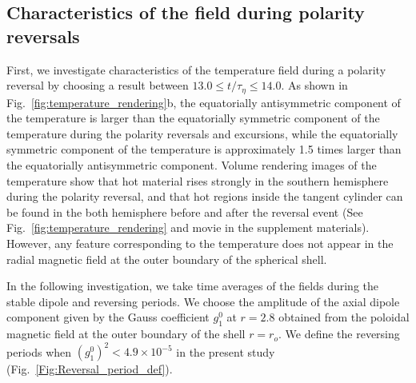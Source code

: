 \subsection{Characteristics of the field during polarity reversals}

First, we investigate characteristics of the temperature field during a polarity reversal by choosing a result between $13.0 \le t/\tau_{\eta} \le 14.0$. 
As shown in Fig.~\ref{fig:temperature_rendering}b, the equatorially antisymmetric component of the temperature is larger than the equatorially symmetric component of the temperature during the polarity reversals and excursions, while the equatorially symmetric component of the temperature is approximately 1.5 times larger than the equatorially antisymmetric component. 
{\color{red}
Volume rendering images of the temperature show that hot material rises strongly in the southern hemisphere during the polarity reversal, and that hot regions inside the tangent cylinder can be found in the both hemisphere before and after the reversal event
(See Fig.~\ref{fig:temperature_rendering} and movie in the supplement materials). 
}
However, any feature corresponding to the temperature does not appear in the radial magnetic field at the outer boundary of the spherical shell.

In the following investigation, we take time averages of the fields during the stable dipole and reversing periods. 
We choose the amplitude of the axial dipole component given by the Gauss coefficient $g_{1}^{0}$ at $r = 2.8$ obtained from the poloidal magnetic field at the outer boundary of the shell $r = r_{o}$. 
We define the reversing periods when $\left( g_{1}^{0} \right)^2 < 4.9 \times 10^{-5}$ in the present study (Fig.~\ref{Fig:Reversal_period_def}). 





